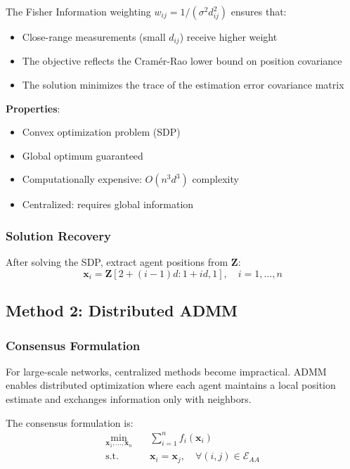 \documentclass[11pt,a4paper]{article}
\begin{document}
The Fisher Information weighting $w_{ij} = 1/(\sigma^2 d_{ij}^2)$ ensures that:
\begin{itemize}
    \item Close-range measurements (small $d_{ij}$) receive higher weight
    \item The objective reflects the Cramér-Rao lower bound on position covariance
    \item The solution minimizes the trace of the estimation error covariance matrix
\end{itemize}

\textbf{Properties}:
\begin{itemize}
    \item Convex optimization problem (SDP)
    \item Global optimum guaranteed
    \item Computationally expensive: $O(n^3 d^3)$ complexity
    \item Centralized: requires global information
\end{itemize}

\subsubsection{Solution Recovery}

After solving the SDP, extract agent positions from $\mathbf{Z}$:
\begin{equation}
\mathbf{x}_i = \mathbf{Z}[2+(i-1)d : 1+id, 1], \quad i = 1, \ldots, n
\end{equation}

\subsection{Method 2: Distributed ADMM}

\subsubsection{Consensus Formulation}

For large-scale networks, centralized methods become impractical. ADMM enables distributed optimization where each agent maintains a local position estimate and exchanges information only with neighbors.

The consensus formulation is:
\begin{equation}
\boxed{
\begin{aligned}
\min_{\mathbf{x}_1, \ldots, \mathbf{x}_n} \quad & \sum_{i=1}^n f_i(\mathbf{x}_i) \\
\text{s.t.} \quad & \mathbf{x}_i = \mathbf{x}_j, \quad \forall (i,j) \in \mathcal{E}_{AA}
\end{aligned}
}
\label{eq:consensus}
\end{equation}
\end{document}

